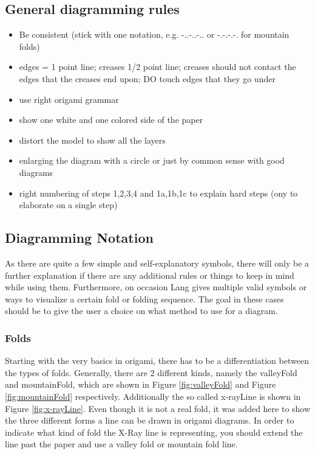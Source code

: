 \subsection{General diagramming rules}
\label{sec:generalRules}

\begin{itemize}
	\item Be consistent (stick with one notation, e.g. -..-..-.. or -.-.-.-. for mountain folds)
	\item edges = 1 point line; creases 1/2 point line; creases should not contact the edges that the creases end upon; DO touch edges that they go under
	\item use right origami grammar
	\item show one white and one colored side of the paper
	\item distort the model to show all the layers
	\item enlarging the diagram with a circle or just by common sense with good diagrams
	\item right numbering of steps 1,2,3,4 and 1a,1b,1c to explain hard steps (ony to elaborate on a single step)
\end{itemize}

\newpage
\subsection{Diagramming Notation}
\label{sec:notation}

As there are quite a few simple and self-explanatory symbols, there will only be a further explanation if there are any additional rules or things to keep in mind while using them. Furthermore, on occasion Lang gives multiple valid symbols or ways to visualize a certain fold or folding sequence. The goal in these cases should be to give the user a choice on what method to use for a diagram. 

\subsubsection{Folds}
\label{sec:folds}

Starting with the very basics in origami, there has to be a differentiation between the types of folds. Generally, there are 2 different kinds, namely the \gls{valleyFold} and \gls{mountainFold}, which are shown in Figure \ref{fig:valleyFold} and Figure \ref{fig:mountainFold} respectively. Additionally the so called \gls{x-rayLine} is shown in Figure \ref{fig:x-rayLine}. Even though it is not a real fold, it was added here to show the three different forms a line can be drawn in origami diagrams. In order to indicate what kind of fold the X-Ray line is representing, you should extend the line past the paper and use a valley fold or mountain fold line.

